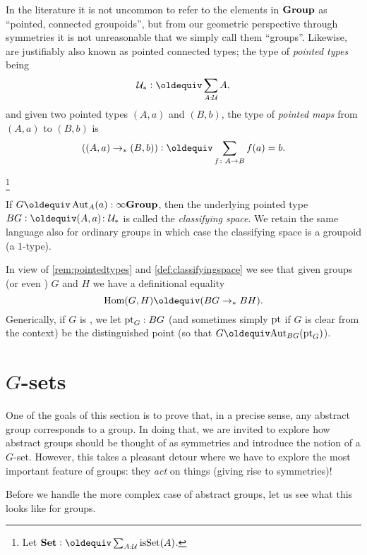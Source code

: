 \begin{remark}\label{rem:pointedtypes}
  In the literature it is not uncommon to refer to the elements in $\mathbf{Group}$ as ``pointed, connected groupoids'', but from our geometric perspective through symmetries it is not unreasonable that we simply call them ``groups''.  Likewise, \inftygps are justifiably also known as pointed connected types;  the type of \emph{pointed types} being
$$\pttype\defequi\sum_{A:\mathcal U}A,$$
and given two pointed types $(A,a)$ and $(B,b)$, the type of \emph{pointed maps} from $(A,a)$ to $(B,b)$ is
$$((A,a)\to_*(B,b))\defequi\sum_{f\colon A\to B}f(a)=b.$$
\end{remark}


\footnote{Let $\typeset\defequi \sum_{A:\mathcal U}\isset(A)$.}
\begin{definition}\label{def:classifyingspace}
  If $G\oldequiv\Aut_A(a):\typeinftygp$, then the underlying pointed type $BG\defequi (A,a)\colon\pttype$ is called the  \emph{classifying space}.  We retain the same language also for ordinary groups in which case the classifying space is a groupoid (\ie a $1$-type).   %
\end{definition}
\begin{remark}
  In view of \cref{rem:pointedtypes} and \cref{def:classifyingspace} we see that given groups (or even \inftygps) $G$ and $H$ we have a definitional equality
$$\Hom(G,H)\oldequiv(BG\to_*BH).$$
Generically, if $G$ is \aninftygp, we let ${\mathord{\mathrm{pt}}}_G:BG$ (and sometimes simply ${\mathord{\mathrm{pt}}}$ if $G$ is clear from the context) be the distinguished point (so that $G\oldequiv\aut_{BG}(\pt_G)$).
\end{remark}





\section{$G$-sets}
\label{sec:gsets}

One of the goals of this section is to prove that, in a precise sense, any abstract group corresponds to a group.  In doing that, we are invited to explore how abstract groups should be thought of as symmetries and introduce the notion of a $G$-set.  However, this takes a pleasant detour where we have to explore the most important feature of groups: they \emph{act} on things (giving rise to symmetries)!

Before we handle the more complex case of abstract groups, let us see what this looks like for groups.

